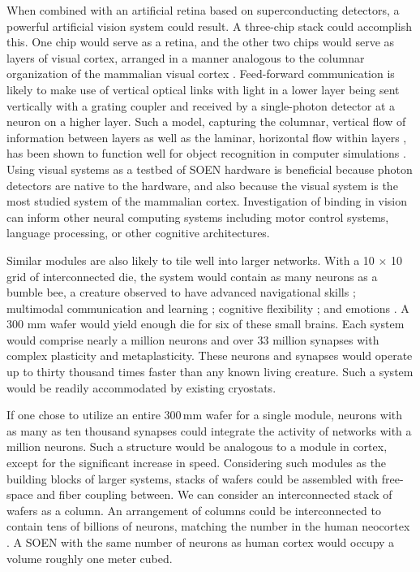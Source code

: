 \documentclass[twocolumn]{article}
\begin{document}
When combined with an artificial retina based on superconducting detectors, a powerful artificial vision system could result. A three-chip stack could accomplish this. One chip would serve as a retina, and the other two chips would serve as layers of visual cortex, arranged in a manner analogous to the columnar organization of the mammalian visual cortex \cite{mo1997}. Feed-forward communication is likely to make use of vertical optical links with light in a lower layer being sent vertically with a grating coupler and received by a single-photon detector at a neuron on a higher layer. Such a model, capturing the columnar, vertical flow of information between layers as well as the laminar, horizontal flow within layers \cite{lued1997,spto2000,brto2006}, has been shown to function well for object recognition in computer simulations \cite{haah2017}. Using visual systems as a testbed of SOEN hardware is beneficial because photon detectors are native to the hardware, and also because the visual system is the most studied system of the mammalian cortex. Investigation of binding in vision \cite{ro1999,tr1999,woca1999,vala2001,enfr2001,haah2017} can inform other neural computing systems including motor control systems, language processing, or other cognitive architectures.

Similar modules are also likely to tile well into larger networks. With a 10 $\times$ 10 grid of interconnected die, the system would contain as many neurons as a bumble bee, a creature observed to have advanced navigational skills \cite{chmi2014}; multimodal communication and learning \cite{alpe2016}; cognitive flexibility \cite{lope2017}; and emotions \cite{peba2016}. A 300 mm wafer would yield enough die for six of these small brains. Each system would comprise nearly a million neurons and over 33 million synapses with complex plasticity and metaplasticity. These neurons and synapses would operate up to thirty thousand times faster than any known living creature. Such a system would be readily accommodated by existing cryostats.  

If one chose to utilize an entire 300\,mm wafer for a single module, neurons with as many as ten thousand synapses could integrate the activity of networks with a million neurons. Such a structure would be analogous to a module in cortex, except for the significant increase in speed. Considering such modules as the building blocks of larger systems, stacks of wafers could be assembled with free-space and fiber coupling between. We can consider an interconnected stack of wafers as a column. An arrangement of columns could be interconnected to contain tens of billions of neurons, matching the number in the human neocortex \cite{brsc1998,he2009}. A SOEN with the same number of neurons as human cortex would occupy a volume roughly one meter cubed. 
\end{document}
